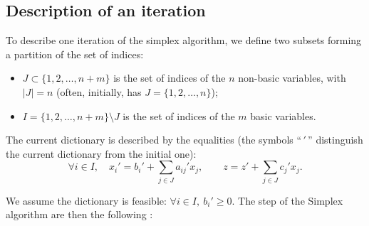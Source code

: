 \subsection{Description of an iteration}

To describe one iteration of the simplex algorithm, we define two subsets forming a partition of the set of indices:

\begin{itemize}
  \item $J \subset \{1,2,\dots,n+m\}$ is the set of indices of the $n$ non-basic variables, with $|J|=n$ (often, initially, has $J=\{1,2,\dots,n\}$);
  \item $I = \{1,2,\dots,n+m\} \setminus J$ is the set of indices of the $m$ basic variables.
\end{itemize}

The current dictionary is described by the equalities (the symbols “$\,'\,$” distinguish the current dictionary from the initial one):
\[
   \forall i \in I, \quad x_i' = b_i' + \sum_{j \in J} a_{ij}' x_j,
   \qquad 
   z = z' + \sum_{j \in J} c_j' x_j .
\]

We assume the dictionary is feasible: $\forall i \in I, \ b_i' \geq 0$. The step of the Simplex algorithm are then the following :

